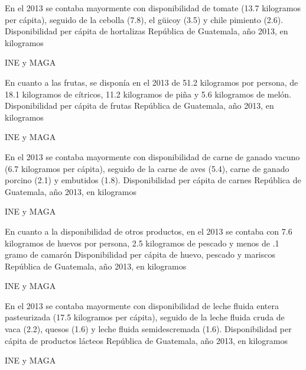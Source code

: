 %
{%
En el 2013 se contaba mayormente con disponibilidad de tomate (13.7 kilogramos per cápita), seguido de la cebolla (7.8), el güicoy (3.5) y chile pimiento (2.6).}%
{%
	Disponibilidad per cápita de hortalizas } %
{%
	República de Guatemala, año 2013, en kilogramos } %
{%
	\begin{tikzpicture}[x=1pt,y=1pt]    \end{tikzpicture}}%
{%
	INE y MAGA} %


%
{%
En cuanto a las frutas, se disponía en el 2013 de 51.2 kilogramos por persona, de 18.1 kilogramos de cítricos, 11.2 kilogramos de piña y 5.6 kilogramos de melón.}%
{%
	Disponibilidad per cápita de frutas } %
{%
	República de Guatemala, año 2013, en kilogramos } %
{%
	\begin{tikzpicture}[x=1pt,y=1pt]    \end{tikzpicture}}%
{%
	INE y MAGA} %


%
{%
En el 2013 se contaba mayormente con disponibilidad de carne de ganado vacuno (6.7 kilogramos per cápita), seguido de la carne de aves (5.4), carne de ganado porcino (2.1) y embutidos (1.8).}%
{%
	Disponibilidad per cápita de carnes } %
{%
	República de Guatemala, año 2013, en kilogramos } %
{%
	\begin{tikzpicture}[x=1pt,y=1pt]    \end{tikzpicture}}%
{%
	INE y MAGA} %


%
{%
En cuanto a la disponibilidad de otros productos, en el 2013 se contaba con 7.6 kilogramos de huevos por persona, 2.5 kilogramos de pescado y menos de .1 gramo de camarón
}%
{%
	Disponibilidad per cápita de huevo, pescado y mariscos } %
{%
	República de Guatemala, año 2013, en kilogramos } %
{%
	\begin{tikzpicture}[x=1pt,y=1pt]    \end{tikzpicture}}%
{%
	INE y MAGA} %


%
{%
En el 2013 se contaba mayormente con disponibilidad de leche fluida entera pasteurizada (17.5 kilogramos per cápita), seguido de la leche fluida cruda de vaca (2.2), quesos (1.6) y leche fluida semidescremada (1.6).}%
{%
	Disponibilidad per cápita de productos lácteos} %
{%
	República de Guatemala, año 2013, en kilogramos } %
{%
	\begin{tikzpicture}[x=1pt,y=1pt]    \end{tikzpicture}}%
{%
	INE y MAGA} %


